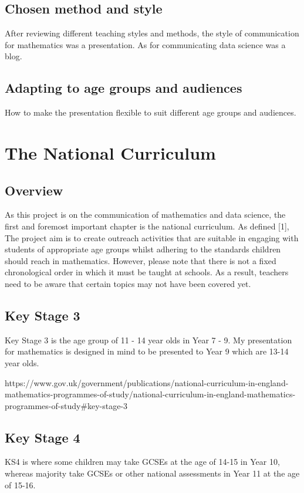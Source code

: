 \documentclass[12pt, a4paper,oneside]{book}
\numberwithin{equation}{section}
\begin{document}
\section{Chosen method and style}

After reviewing different teaching styles and methods, the style of communication for mathematics was a presentation. As for communicating data science was a blog.

\section{Adapting to age groups and audiences}

How to make the presentation flexible to suit different age groups and audiences.

\chapter{The National Curriculum}
\section{Overview}
As this project is on the communication of mathematics and data science, the first and foremost important chapter is the national curriculum. As defined [1], The project aim is to create outreach activities that are suitable in engaging with students of appropriate age groups whilst adhering to the standards children should reach in mathematics. However, please note that there is not a fixed chronological order in which it must be taught at schools. As a result, teachers need to be aware that certain topics may not have been covered yet.

\section{Key Stage 3}
Key Stage 3 is the age group of 11 - 14 year olds in Year 7 - 9. My presentation for mathematics is designed in mind to be presented to Year 9 which are 13-14 year olds.

https://www.gov.uk/government/publications/national-curriculum-in-england-mathematics-programmes-of-study/national-curriculum-in-england-mathematics-programmes-of-study#key-stage-3

\section{Key Stage 4}
KS4 is where some children may take GCSEs at the age of 14-15 in Year 10, whereas majority take GCSEs or other national assessments in Year 11 at the age of 15-16.
\end{document}
